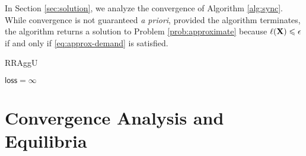 \documentclass[letterpaper, 10 pt, conference]{ieeeconf}
\begin{document}
In Section \ref{sec:solution}, we analyze the convergence of Algorithm \ref{alg:sync}. While convergence is not guaranteed \emph{a priori}, provided the algorithm terminates, the algorithm returns a solution to Problem \ref{prob:approximate} because $\ell(\mathbf{X}) \leqslant \epsilon$ if and only if
\eqref{eq:approx-demand} is satisfied.

\begin{algorithm}[t]
\caption{ RRAggU} \label{alg:sync}
$\mathsf{loss} = \infty$ \\
\end{algorithm}

\section{Convergence Analysis and Equilibria}
\label{sec:solutions}
\end{document}
